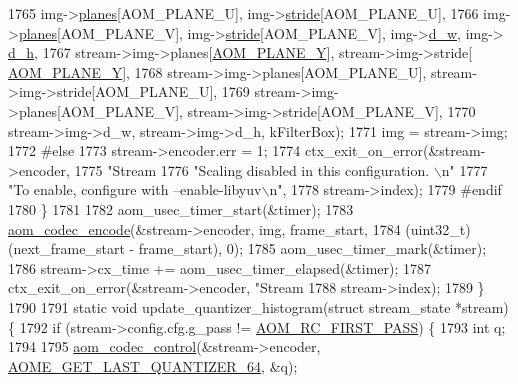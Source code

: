 \begin{DoxyCodeInclude}
{{{{{{{{{{{{{{{{{{{{{{{{{{{{{{{{{{{{{{{{1765         img->\hyperlink{structaom__image_ac54dbc5237ca2914f9ec30105dfbe302}{planes}[AOM\_PLANE\_U], img->\hyperlink{structaom__image_a6dc693d7dbc9eb06c0cdde307ca58372}{stride}[AOM\_PLANE\_U],
1766         img->\hyperlink{structaom__image_ac54dbc5237ca2914f9ec30105dfbe302}{planes}[AOM\_PLANE\_V], img->\hyperlink{structaom__image_a6dc693d7dbc9eb06c0cdde307ca58372}{stride}[AOM\_PLANE\_V], img->\hyperlink{structaom__image_a89f80b1f58d608b9d2080635f4359034}{d\_w}, img->
      \hyperlink{structaom__image_ab986419a1f0fff93a2dc505f47194988}{d\_h},
1767         stream->img->planes[\hyperlink{aom__image_8h_a2ad22076006b15cf809edcaa33f6d339}{AOM\_PLANE\_Y}], stream->img->stride[
      \hyperlink{aom__image_8h_a2ad22076006b15cf809edcaa33f6d339}{AOM\_PLANE\_Y}],
1768         stream->img->planes[AOM\_PLANE\_U], stream->img->stride[AOM\_PLANE\_U],
1769         stream->img->planes[AOM\_PLANE\_V], stream->img->stride[AOM\_PLANE\_V],
1770         stream->img->d\_w, stream->img->d\_h, kFilterBox);
1771     img = stream->img;
1772 \textcolor{preprocessor}{#else}
1773     stream->encoder.err = 1;
1774     ctx\_exit\_on\_error(&stream->encoder,
1775         \textcolor{stringliteral}{"Stream %
1776         \textcolor{stringliteral}{"Scaling disabled in this configuration. \(\backslash\)n"}
1777         \textcolor{stringliteral}{"To enable, configure with --enable-libyuv\(\backslash\)n"},
1778         stream->index);
1779 \textcolor{preprocessor}{#endif}
1780   \}
1781 
1782   aom\_usec\_timer\_start(&timer);
1783   \hyperlink{group__encoder_ga6f4a777de5389771e783df7ff1f116d4}{aom\_codec\_encode}(&stream->encoder, img, frame\_start,
1784       (uint32\_t)(next\_frame\_start - frame\_start), 0);
1785   aom\_usec\_timer\_mark(&timer);
1786   stream->cx\_time += aom\_usec\_timer\_elapsed(&timer);
1787   ctx\_exit\_on\_error(&stream->encoder, \textcolor{stringliteral}{"Stream %
1788       stream->index);
1789 \}
1790 
1791 \textcolor{keyword}{static} \textcolor{keywordtype}{void} update\_quantizer\_histogram(\textcolor{keyword}{struct} stream\_state *stream) \{
1792   \textcolor{keywordflow}{if} (stream->config.cfg.g\_pass != \hyperlink{group__encoder_gga92b6709b58dc3435e3ba652da562eda1ad342b33a290482c20238bfde5d9bea1e}{AOM\_RC\_FIRST\_PASS}) \{
1793     \textcolor{keywordtype}{int} q;
1794 
1795     \hyperlink{group__codec_ga6da974f4eeaba1fa74106b28d0fe6ac5}{aom\_codec\_control}(&stream->encoder, 
      \hyperlink{group__aom__encoder_ggae78dde67a6d78f332e9bdba0dde42db5a17b924cadd3c942f9e57fe6fc4d5e2ab}{AOME\_GET\_LAST\_QUANTIZER\_64}, &q);
}}}}}}}}}}}}}}}}}}}}}}}}}}}}}}}}}}}}}}}}}}
\end{DoxyCodeInclude}
